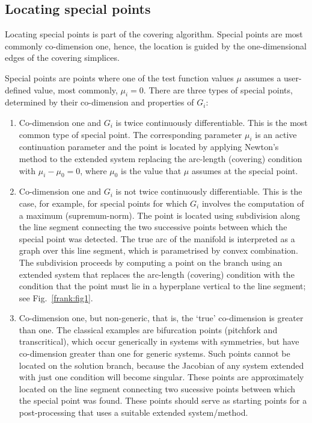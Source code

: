 \documentclass[twoside,draft,a4paper]{article}
\newcommand{\fig}{Fig.}
\newcommand{\figref}[1]{{\fig~\ref{#1}}}
\begin{document}
\subsection{Locating special points}

Locating special points is part of the covering algorithm. Special points are most commonly co-dimension one, hence, the location is guided by the one-dimensional edges of the covering simplices.

Special points are points where one of the test function values $\mu$ assumes a user-defined value, most commonly, $\mu_i=0$. There are three types of special points, determined by their co-dimension and properties of $G_i$:
%
\begin{enumerate}
\item Co-dimension one and $G_i$ is twice continuously differentiable. This is the most common type of special point. The corresponding parameter $\mu_i$ is an active continuation parameter and the point is located by applying Newton's method to the extended system replacing the arc-length (covering) condition with $\mu_i-\mu_0=0$, where $\mu_0$ is the value that $\mu$ assumes at the special point.

\item Co-dimension one and $G_i$ is not twice continuously differentiable. This is the case, for example, for special points for which $G_i$ involves the computation of a maximum (supremum-norm). The point is located using subdivision along the line segment connecting the two successive points between which the special point was detected. The true arc of the manifold is interpreted as a graph over this line segment, which is parametrised by convex combination. The subdivision proceeds by computing a point on the branch using an extended system that replaces the arc-length (covering) condition with the condition that the point must lie in a hyperplane vertical to the line segment; see \figref{frank:fig1}.

\item Co-dimension one, but non-generic, that is, the `true' co-dimension is greater than one. The classical examples are bifurcation points (pitchfork and transcritical), which occur generically in systems with symmetries, but have co-dimension greater than one for generic systems. Such points cannot be located on the solution branch, because the Jacobian of any system extended with just one condition will become singular. These points are approximately located on the line segment connecting two sucessive points between which the special point was found. These points should serve as starting points for a post-processing that uses a suitable extended system/method.
\end{enumerate}
\end{document}
